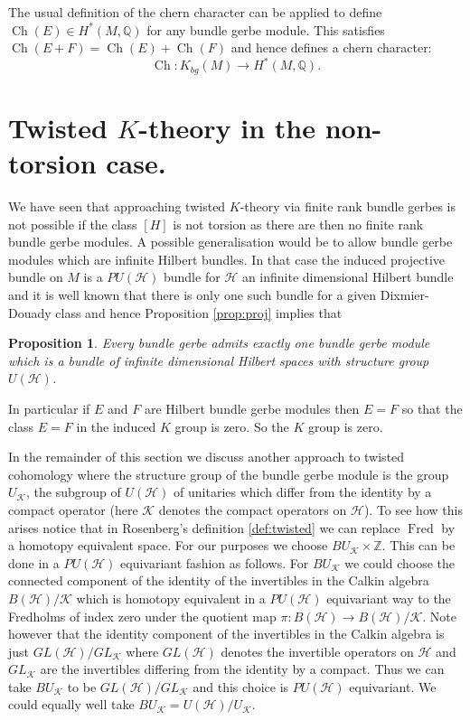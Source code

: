 \documentclass[a4paper,reqno]{amsart}
\DeclareMathOperator{\Fred}{Fred}
\DeclareMathOperator{\Ch}{Ch}
\theoremstyle{plain}
\newtheorem{proposition}[theorem]{Proposition}
\theoremstyle{definition}
\theoremstyle{remark}
\numberwithin{equation}{section}
\numberwithin{figure}{section}
\newcommand{\cH}{{\mathcal H}}
\newcommand{\ZZ}{{\mathbb Z}}
\newcommand{\QQ}{{\mathbb Q}}
\newcommand{\UK}{U{_\mathcal K}}
\newcommand{\<}{\langle}
\renewcommand{\>}{\rangle}
\begin{document}
The usual definition of the chern character can be applied to define
$\Ch(E) \in H^*(M, \QQ)$
for any bundle gerbe module. This satisfies $\Ch(E+F) = \Ch(E) +
\Ch(F)$ and hence
defines a chern character:
$$
\Ch \colon K_{bg}(M) \to H^*(M, \QQ).
$$

\section{Twisted $K$-theory in the  non-torsion case.}
\label{sec:non-torsion case} 

We have seen that approaching twisted $K$-theory via finite rank
bundle gerbes is not possible if the class $[H]$
is not torsion as there are then no finite rank bundle gerbe modules.
A possible
generalisation would be to allow bundle gerbe modules which
are infinite Hilbert bundles. In that case the induced
projective bundle on $M$ is a $PU(\cH)$ bundle for $\cH$
an infinite dimensional Hilbert bundle and it is well
known that there is only one such bundle for a given
Dixmier-Douady class and hence Proposition \ref{prop:proj}
implies that

\begin{proposition}
Every bundle gerbe admits exactly one bundle gerbe module which is a
bundle of infinite dimensional Hilbert spaces  with structure group $U(\cH)$.
\end{proposition}


In particular if $E$ and $F$ are Hilbert bundle gerbe modules
then $E = F$ so that the class $E=F$ in the induced
$K$ group is zero. So the $K$ group is zero.

In the remainder of this section
we discuss another approach to twisted cohomology
where the structure group of the bundle gerbe module
is the group $\UK$, the subgroup of $U(\cH)$ 
of unitaries which differ from the identity by a compact 
operator (here $\mathcal{K}$ denotes the compact operators 
on $\cH$).  
To see how this arises notice that in
Rosenberg's definition \ref{def:twisted} we can replace  $\Fred$ by a
homotopy equivalent space.
For our purposes we choose $BU{_\mathcal K}\times \ZZ$.  
This can be done in a $PU(\cH)$
equivariant fashion as follows. For $BU{_\mathcal K}$
we could choose the connected component of the
identity of the invertibles in the Calkin algebra $B(\cH)/\mathcal K$
which is homotopy equivalent in a $PU(\cH)$ equivariant way
to the Fredholms of index zero under the quotient map
$\pi: B(\cH)\to B(\cH)/\mathcal K$. Note however
that the identity component of the invertibles in the Calkin
algebra is just $GL(\cH)/GL_\mathcal K$ where $GL(\cH)$
denotes the invertible operators on $\cH$ and $GL_\mathcal K$
are the invertibles differing from the identity by a compact.
Thus we can take $BU_{\mathcal K}$ to be $GL(\cH)/GL_{\mathcal K}$
and this choice is $PU(\cH)$ equivariant. We could equally well take
$B\UK = U(\cH)/\UK$.
\end{document}
